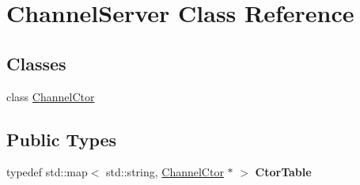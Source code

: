 \hypertarget{classChannelServer}{}\section{Channel\+Server Class Reference}
\label{classChannelServer}
\subsection*{Classes}
\begin{DoxyCompactItemize}
\item 
class \hyperlink{classChannelServer_1_1ChannelCtor}{Channel\+Ctor}
\end{DoxyCompactItemize}
\subsection*{Public Types}
\begin{DoxyCompactItemize}
\item 
\mbox{\label{classChannelServer_adde1c6e4f0cac691b23c8746cea7e7b6}} 
typedef std\+::map$<$ std\+::string, \hyperlink{classChannelServer_1_1ChannelCtor}{Channel\+Ctor} $\ast$ $>$ {\bfseries Ctor\+Table}
\end{DoxyCompactItemize}
